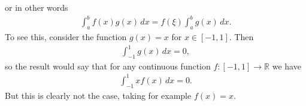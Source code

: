 \documentclass[letterpaper,10pt,english]{jupyterBook}
\begin{document}
\sphinxAtStartPar
or in other words
\begin{equation*}
\begin{split}
\int_a^b f(x)g(x)\, dx = f(\xi ) \int_a^b g(x)\, dx .
\end{split}
\end{equation*}
\sphinxAtStartPar
{} To see this, consider the function \(g(x) = x\) for \(x\in [-1,1]\). Then
\begin{equation*}
\begin{split}
\int_{-1}^1 g(x)\, dx =0,
\end{split}
\end{equation*}
\sphinxAtStartPar
so the result would say that for any continuous function \(f\colon [-1,1]\rightarrow \mathbb{R}\) we have
\begin{equation*}
\begin{split}
\int_{-1}^1 xf(x)\, dx =0.
\end{split}
\end{equation*}
\sphinxAtStartPar
But this is clearly not the case, taking for example \(f(x)=x\).







\renewcommand{\indexname}{Index}
\printindex
\end{document}
